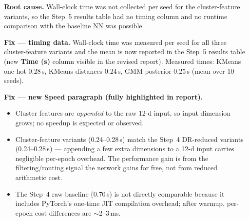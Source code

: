 \documentclass[letterpaper, 10.5pt]{article}
\begin{document}
\textbf{Root cause.} Wall-clock time was not collected per seed for the
cluster-feature variants, so the Step~5 results table had no timing column
and no runtime comparison with the baseline NN was possible.

\textbf{Fix --- timing data.}
Wall-clock time was measured per seed for all three cluster-feature
variants and the mean is now reported in the Step~5 results table
(new \textbf{Time (s)} column visible in the revised report).
Measured times: KMeans one-hot 0.28\,s, KMeans distances 0.24\,s,
GMM posterior 0.25\,s (mean over 10 seeds).

\textbf{Fix --- new Speed paragraph (fully highlighted in report).}
\begin{itemize}
  \item Cluster features are \emph{appended} to the raw 12-d input, so
        input dimension grows; no speedup is expected or observed.
  \item Cluster-feature variants (0.24--0.28\,s) match the Step~4
        DR-reduced variants (0.24--0.28\,s) --- appending a few extra
        dimensions to a 12-d input carries negligible per-epoch overhead.
        The performance gain is from the filtering/routing signal
        the network gains for free, not from reduced arithmetic cost.
  \item The Step~4 raw baseline (0.70\,s) is not directly comparable
        because it includes PyTorch's one-time JIT compilation overhead;
        after warmup, per-epoch cost differences are $\sim$2--3\,ms.
\end{itemize}
\end{document}
